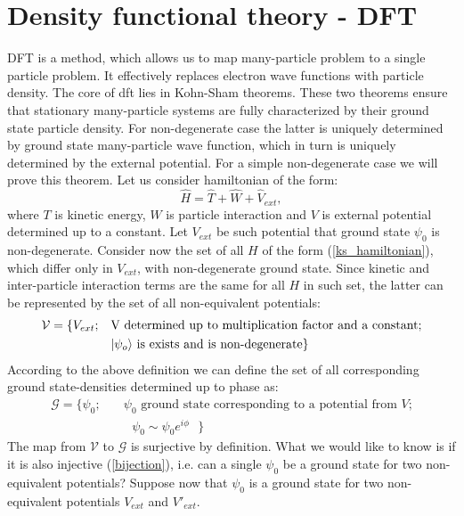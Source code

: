 \message{ !name(document.tex)}\documentclass[openany, longbibliography,slovene,a4paper,12pt]{article}
\begin{document}
\section{Density functional theory - DFT}
DFT is a method, which allows us to map many-particle problem to a
single particle problem. It effectively replaces electron wave functions with
particle density.  The core of dft lies in Kohn-Sham theorems. These two theorems
ensure that stationary many-particle systems are fully characterized by their
ground state particle density. For non-degenerate case the latter is uniquely determined
by ground state many-particle wave function, which in turn is uniquely determined by the
external potential. For a simple non-degenerate case we will prove this theorem. Let us consider hamiltonian of the form:
\begin{equation} \label{ks_hamiltonian}
\hat H = \hat T + \hat W + \hat V_{ext},
\end{equation}
where $T$ is kinetic energy, $W$ is particle interaction and $V$ is external
potential determined up to a constant. Let $V_{ext}$ be such potential that
ground state $\psi_0$ is non-degenerate. Consider now the set of all $H$ of the
form (\ref{ks_hamiltonian}), which
differ only in $V_{ext}$, with non-degenerate ground state. Since kinetic and
inter-particle interaction terms are the same for all $H$ in such set, the latter
can be represented by the set of all non-equivalent potentials:
\begin{equation}
  \begin{split}
    \mathcal{V} = \{V_{ext};\quad &\textrm{V determined up to multiplication factor and a constant;}\\
    & \textrm{$\ket{\psi_o}$ is exists and is non-degenerate}\}
    \end{split}
 \end{equation}
According to the above definition we can define the set of all corresponding
ground state-densities determined up to phase as:
\begin{equation}
  \begin{split}
    \mathcal{G} = \{\psi_0; \quad &\textrm{$\psi_0$ ground state corresponding to a potential from $V$;}\\
&\textrm{ $\psi_0\sim\psi_0e^{i\phi}$   }
    \}
    \end{split}
  \end{equation}
The map from $\mathcal{V}$ to $\mathcal{G}$ is surjective by definition. What we
would like to know is if it is also injective  (\ref{bijection}), i.e. can a single $\psi_0$ be a
ground state for two non-equivalent potentials? Suppose now that $\psi_0$ is a
ground state for two non-equivalent potentials $V_{ext}$ and $V'_{ext}$.
\end{document}
